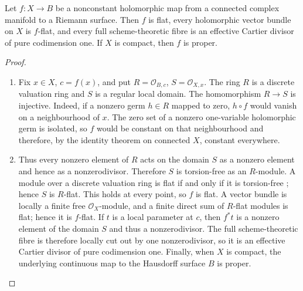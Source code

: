 \begin{lemma}
\hypertarget{tag-03I8}{}\label{wbII:lem:curve-flatness}

Let $f:X\to B$ be a nonconstant holomorphic map from a connected
complex manifold to a Riemann surface.  Then $f$ is flat, every holomorphic
vector bundle on $X$ is $f$-flat, and every full scheme-theoretic fibre is an
effective Cartier divisor of pure codimension one.  If $X$ is compact, then
$f$ is proper.
\end{lemma}



\begin{proof}

\begin{enumerate}[label=\arabic*.,leftmargin=*]
\item Fix $x\in X$, $c=f(x)$, and put
$R=\mathcal O_{B,c}$, $S=\mathcal O_{X,x}$.  The ring $R$ is a discrete
valuation ring and $S$ is a regular local domain.  The homomorphism
$R\to S$ is injective.  Indeed, if a nonzero germ $h\in R$ mapped to zero,
$h\circ f$ would vanish on a neighbourhood of $x$.  The zero set of a
nonzero one-variable holomorphic germ is isolated, so $f$ would be constant
on that neighbourhood and therefore, by the identity theorem on connected
$X$, constant everywhere.

\item Thus every nonzero element of $R$ acts on the domain $S$ as a nonzero
element and hence as a nonzerodivisor.  Therefore $S$ is torsion-free as an
$R$-module.  A module over a discrete valuation ring is flat if and only if
it is torsion-free \cite[Tag~0AUW]{StacksProject}; hence $S$ is $R$-flat.
This holds at every point, so $f$ is flat.  A vector bundle is locally a
finite free $\mathcal O_X$-module, and a finite direct sum of $R$-flat
modules is flat; hence it is $f$-flat.  If $t$ is a local parameter at
$c$, then $f^*t$ is a nonzero element of the domain $S$ and thus a
nonzerodivisor.  The full scheme-theoretic fibre is therefore locally cut
out by one nonzerodivisor, so it is an effective Cartier divisor of pure
codimension one.  Finally, when $X$ is compact, the underlying continuous
map to the Hausdorff surface $B$ is proper.

\end{enumerate}
\end{proof}